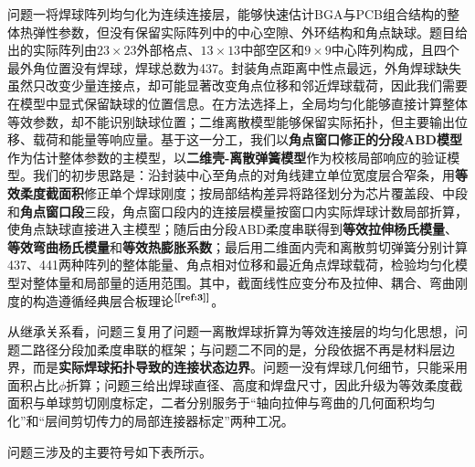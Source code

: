 \documentclass[draft,12pt,a4paper]{ctexart}
\theoremstyle{definition}
\begin{document}
问题一将焊球阵列均匀化为连续连接层，能够快速估计BGA与PCB组合结构的整体热弹性参数，但没有保留实际阵列中的中心空隙、外环结构和角点缺球。题目给出的实际阵列由$23\times23$外部格点、$13\times13$中部空区和$9\times9$中心阵列构成，且四个最外角位置没有焊球，焊球总数为437。封装角点距离中性点最远，外角焊球缺失虽然只改变少量连接点，却可能显著改变角点位移和邻近焊球载荷，因此我们需要在模型中显式保留缺球的位置信息。在方法选择上，全局均匀化能够直接计算整体等效参数，却不能识别缺球位置；二维离散模型能够保留实际拓扑，但主要输出位移、载荷和能量等响应量。基于这一分工，我们以\textbf{角点窗口修正的分段ABD模型}作为估计整体参数的主模型，以\textbf{二维壳-离散弹簧模型}作为校核局部响应的验证模型。我们的初步思路是：沿封装中心至角点的对角线建立单位宽度层合窄条，用\textbf{等效柔度截面积}修正单个焊球刚度；按局部结构差异将路径划分为芯片覆盖段、中段和\textbf{角点窗口段}三段，角点窗口段内的连接层模量按窗口内实际焊球计数局部折算，使角点缺球直接进入主模型；随后由分段ABD柔度串联得到\textbf{等效拉伸杨氏模量}、\textbf{等效弯曲杨氏模量}和\textbf{等效热膨胀系数}；最后用二维面内壳和离散剪切弹簧分别计算437、441两种阵列的整体能量、角点相对位移和最近角点焊球载荷，检验均匀化模型对整体量和局部量的适用范围。其中，截面线性应变分布及拉伸、耦合、弯曲刚度的构造遵循经典层合板理论$^{\textbf{[\ref{ref:3}]}}$。



从继承关系看，问题三复用了问题一离散焊球折算为等效连接层的均匀化思想，问题二路径分段加柔度串联的框架；与问题二不同的是，分段依据不再是材料层边界，而是\textbf{实际焊球拓扑导致的连接状态边界}。问题一没有焊球几何细节，只能采用面积占比$\phi$折算；问题三给出焊球直径、高度和焊盘尺寸，因此升级为等效柔度截面积与单球剪切刚度标定，二者分别服务于“轴向拉伸与弯曲的几何面积均匀化”和“层间剪切传力的局部连接器标定”两种工况。


问题三涉及的主要符号如下表所示。
\end{document}
